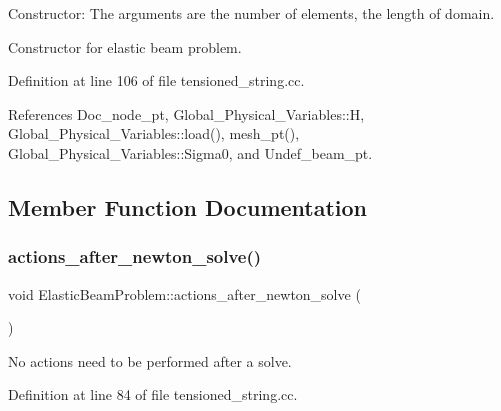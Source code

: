 Constructor\+: The arguments are the number of elements, the length of domain. 

Constructor for elastic beam problem. 

Definition at line 106 of file tensioned\+\_\+string.\+cc.



References Doc\+\_\+node\+\_\+pt, Global\+\_\+\+Physical\+\_\+\+Variables\+::H, Global\+\_\+\+Physical\+\_\+\+Variables\+::load(), mesh\+\_\+pt(), Global\+\_\+\+Physical\+\_\+\+Variables\+::\+Sigma0, and Undef\+\_\+beam\+\_\+pt.



\subsection{Member Function Documentation}
\mbox{\label{classElasticBeamProblem_a30dde8d0101a3d3994965d6e560cb585}} 
\subsubsection{\texorpdfstring{actions\+\_\+after\+\_\+newton\+\_\+solve()}{actions\_after\_newton\_solve()}}
{\footnotesize\ttfamily void Elastic\+Beam\+Problem\+::actions\+\_\+after\+\_\+newton\+\_\+solve (\begin{DoxyParamCaption}{ }\end{DoxyParamCaption})\hspace{0.3cm}{\ttfamily [inline]}}



No actions need to be performed after a solve. 



Definition at line 84 of file tensioned\+\_\+string.\+cc.

\mbox{\label{classElasticBeamProblem_a5b534c11d9b1d54123bf587aad5f98f6}} 
